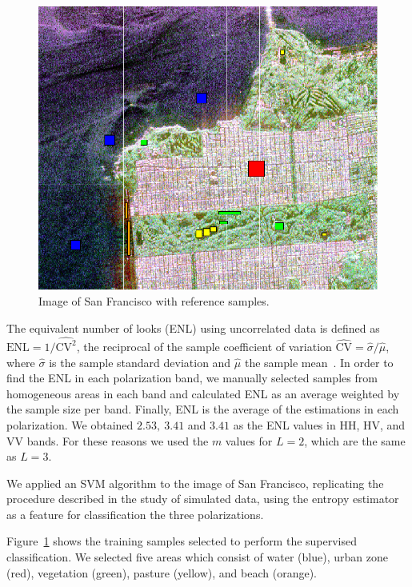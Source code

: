 \documentclass[journal]{IEEEtran}
\begin{document}
\begin{figure}[hbt]
	\centering
	\includegraphics[width=0.9\linewidth]{../../../Figures/CISS2021/muestras_entrenamiento_color2.pdf}
	\caption{Image of San Francisco with reference samples.}
	\label{TrainingSamples}
\end{figure}    

The equivalent number of looks (ENL) using uncorrelated data is defined as
$\text{ENL}={1}/{\widehat{\text{CV}^2}}$, the reciprocal of the sample coefficient of variation $\widehat{\text{CV}}={\widehat{\sigma}}/{\widehat\mu}$, where $\widehat{\sigma}$ is the sample standard deviation and $\widehat\mu$ the sample mean~\cite{Anfinsen2009}. In order to find the ENL in each polarization band, we manually selected samples from homogeneous areas in each band and calculated ENL as an average weighted by the sample size per band. Finally, ENL is the average of the estimations in each polarization. We obtained $2.53, \ 3.41$ and $3.41$ as the ENL values in HH, HV, and VV bands. For these reasons we used the $m$ values for $L=2$, which are the same as $L=3$. 

We applied an SVM algorithm to the image of San Francisco, replicating the procedure described in the study of simulated data, using the entropy estimator as a feature for classification the three polarizations.

Figure~\ref{TrainingSamples} shows the training samples selected to perform the supervised classification. We selected five areas which consist of water (blue), urban zone (red), vegetation (green), pasture (yellow), and beach (orange). 
\end{document}
